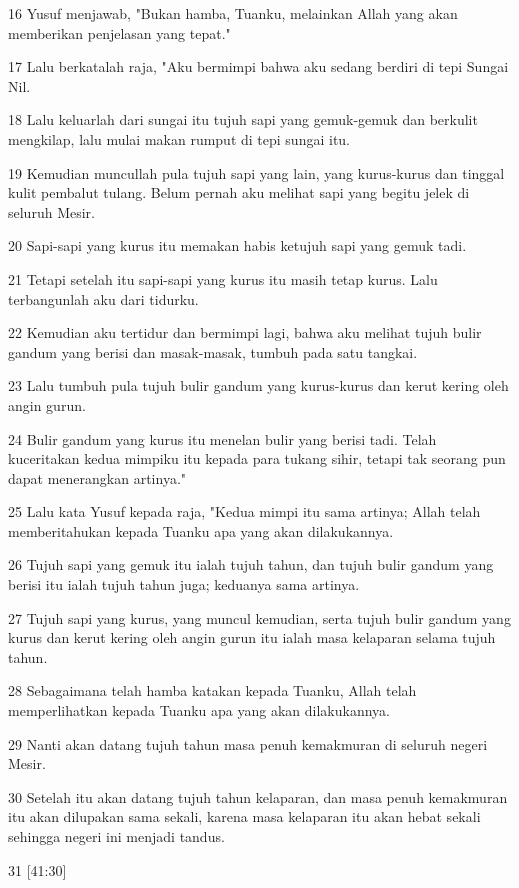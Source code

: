 \par 16 Yusuf menjawab, "Bukan hamba, Tuanku, melainkan Allah yang akan memberikan penjelasan yang tepat."
\par 17 Lalu berkatalah raja, "Aku bermimpi bahwa aku sedang berdiri di tepi Sungai Nil.
\par 18 Lalu keluarlah dari sungai itu tujuh sapi yang gemuk-gemuk dan berkulit mengkilap, lalu mulai makan rumput di tepi sungai itu.
\par 19 Kemudian muncullah pula tujuh sapi yang lain, yang kurus-kurus dan tinggal kulit pembalut tulang. Belum pernah aku melihat sapi yang begitu jelek di seluruh Mesir.
\par 20 Sapi-sapi yang kurus itu memakan habis ketujuh sapi yang gemuk tadi.
\par 21 Tetapi setelah itu sapi-sapi yang kurus itu masih tetap kurus. Lalu terbangunlah aku dari tidurku.
\par 22 Kemudian aku tertidur dan bermimpi lagi, bahwa aku melihat tujuh bulir gandum yang berisi dan masak-masak, tumbuh pada satu tangkai.
\par 23 Lalu tumbuh pula tujuh bulir gandum yang kurus-kurus dan kerut kering oleh angin gurun.
\par 24 Bulir gandum yang kurus itu menelan bulir yang berisi tadi. Telah kuceritakan kedua mimpiku itu kepada para tukang sihir, tetapi tak seorang pun dapat menerangkan artinya."
\par 25 Lalu kata Yusuf kepada raja, "Kedua mimpi itu sama artinya; Allah telah memberitahukan kepada Tuanku apa yang akan dilakukannya.
\par 26 Tujuh sapi yang gemuk itu ialah tujuh tahun, dan tujuh bulir gandum yang berisi itu ialah tujuh tahun juga; keduanya sama artinya.
\par 27 Tujuh sapi yang kurus, yang muncul kemudian, serta tujuh bulir gandum yang kurus dan kerut kering oleh angin gurun itu ialah masa kelaparan selama tujuh tahun.
\par 28 Sebagaimana telah hamba katakan kepada Tuanku, Allah telah memperlihatkan kepada Tuanku apa yang akan dilakukannya.
\par 29 Nanti akan datang tujuh tahun masa penuh kemakmuran di seluruh negeri Mesir.
\par 30 Setelah itu akan datang tujuh tahun kelaparan, dan masa penuh kemakmuran itu akan dilupakan sama sekali, karena masa kelaparan itu akan hebat sekali sehingga negeri ini menjadi tandus.
\par 31 [41:30]
